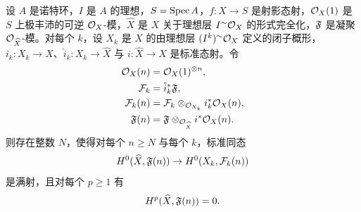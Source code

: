 \begin{lemma}\label{it:2.7.17}
设 $A$ 是诺特环，$I$ 是 $A$ 的理想，$S=\operatorname{Spec} A$，$f\colon X\to S$ 是射影态射，$\mathcal{O}_X(1)$ 是 $S$ 上极丰沛的可逆 $\mathcal{O}_X$-模，$\widehat{X}$ 是 $X$ 关于理想层 $I^{\sim}\mathcal{O}_X$ 的形式完全化，$\mathfrak{F}$ 是凝聚 $\mathcal{O}_{\widehat{X}}$-模。对每个 $k$，设 $X_k$ 是 $X$ 的由理想层 $(I^k)^{\sim}\mathcal{O}_X$ 定义的闭子概形，$i_k\colon X_k\to X$、$\hat{i}_k\colon X_k\to\widehat{X}$ 与 $i\colon\widehat{X}\to X$ 是标准态射。令
\begin{align*}
\mathcal{O}_X(n)&=\mathcal{O}_X(1)^{\otimes n},\\
\mathcal{F}_k&=\hat{i}_k^*\mathfrak{F},\\
\mathcal{F}_k(n)&=\mathcal{F}_k\otimes_{\mathcal{O}_{X_k}}i_k^*\mathcal{O}_X(n),\\
\mathfrak{F}(n)&=\mathfrak{F}\otimes_{\mathcal{O}_{\widehat{X}}}i^*\mathcal{O}_X(n).
\end{align*}
则存在整数 $N$，使得对每个 $n\ge N$ 与每个 $k$，标准同态
\begin{equation*}
H^0(\widehat{X},\mathfrak{F}(n))\to H^0(X_k,\mathcal{F}_k(n))
\end{equation*}
是满射，且对每个 $p\ge1$ 有
\begin{equation*}
H^p(\widehat{X},\mathfrak{F}(n))=0.
\end{equation*}
\end{lemma}

